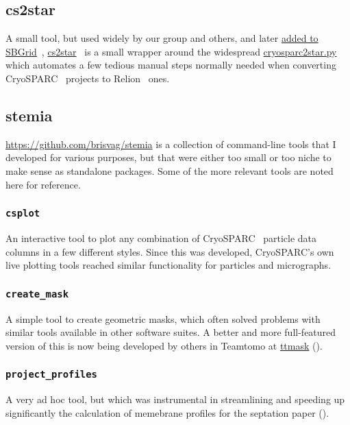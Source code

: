 \subsection{cs2star}

A small tool, but used widely by our group and others, and later \href{https://sbgrid.org/software/titles/cs2star}{added to SBGrid}~\cite{morinCuttingEdgeCollaboration2013}, \href{https://github.com/brisvag/cs2star}{cs2star}~\cite{gaifasCs2starPy2021} is a small wrapper around the widespread \href{https://github.com/asarnow/pyem}{cryosparc2star.py} which automates a few tedious manual steps normally needed when converting CryoSPARC~\cite{punjaniCryoSPARCAlgorithmsRapid2017} projects to Relion~\cite{scheresRELIONImplementationBayesian2012} ones.

\subsection{stemia}

\href{Stemia}{https://github.com/brisvag/stemia} is a collection of command-line tools that I developed for various purposes, but that were either too small or too niche to make sense as standalone packages.
Some of the more relevant tools are noted here for reference.

\subsubsection{\texttt{csplot}}
An interactive tool to plot any combination of CryoSPARC~\cite{punjaniCryoSPARCAlgorithmsRapid2017} particle data columns in a few different styles.
Since this was developed, CryoSPARC's own live plotting tools reached similar functionality for particles and micrographs.

\subsubsection{\texttt{create\_mask}}
A simple tool to create geometric masks, which often solved problems with similar tools available in other software suites.
A better and more full-featured version of this is now being developed by others in Teamtomo at \href{https://github.com/teamtomo/ttmask}{ttmask} ().

\subsubsection{\texttt{project\_profiles}}
A very ad hoc tool, but which was instrumental in streamlining and speeding up significantly the calculation of memebrane profiles for the septation paper ().


